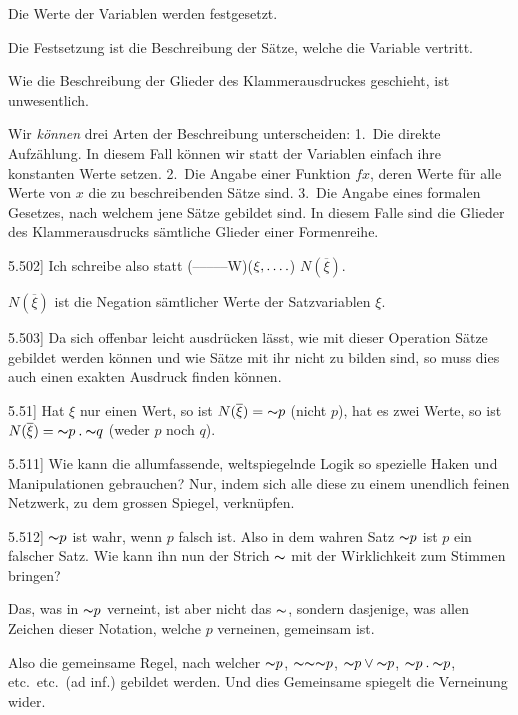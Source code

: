 \documentclass[12pt,oneside]{book}[2007/10/19]
\newcommand{\PropERef}[1]{\hyperref[PropE:#1]{#1}}
\newcommand{\PropositionG}[2]{%
  \item[\phantomsection\label{PropG:#1}\PropERef{#1}] #2%
}
\newcommand{\DPtypo}[2]{#2}
\newcommand{\Not}[1]{\mathord{\thicksim} #1}
\newcommand{\DotOp}{\mathbin{.}}
\newcommand{\Emph}[1]{\emph{#1}}%
\newcommand{\fourdots}{\mathinner{\ldotp\ldotp\ldotp\ldotp}}
\newcommand{\AllowBreak}{\discretionary{}{}{}}
\begin{document}
\begin{propositions}
{Die Werte der Variablen werden festgesetzt.

Die Festsetzung ist die Beschreibung der Sätze,
welche die Variable vertritt.

Wie die Beschreibung der Glieder des Klammerausdruckes
geschieht, ist unwesentlich.

Wir \Emph{können} drei Arten der Beschreibung
unterscheiden: 1.~Die direkte Aufzählung. In
diesem Fall können wir statt der Variablen einfach
ihre konstanten Werte setzen. 2.~Die Angabe
einer Funktion $fx$, deren Werte für alle Werte von
$x$ die zu beschreibenden Sätze sind. 3.~Die Angabe
eines formalen Gesetzes, nach welchem jene Sätze
gebildet sind. In diesem Falle sind die Glieder des
Klammerausdrucks sämtliche Glieder einer Formenreihe.}


\PropositionG{5.502}
{Ich schreibe also statt \mbox{\glqq{}(--\;--\;--\;--\;--W)}\AllowBreak($\xi, \fourdots$)\grqq{}
\glqq{}$N(\overline{\xi})$\grqq{}.

$N(\overline{\xi})$ ist die Negation sämtlicher Werte der
Satzvariablen $\xi$.}


\PropositionG{5.503}
{Da sich offenbar leicht ausdrücken lässt, wie mit
dieser Operation Sätze gebildet werden können und
wie Sätze mit ihr nicht zu bilden sind, so muss
dies auch einen exakten Ausdruck finden können.}


\PropositionG{5.51}
{Hat $\xi$ nur einen Wert, so ist $N(\overline{\xi}) = \Not{p}$ (nicht $p$),
hat es zwei Werte, so ist $N(\overline{\xi}) = \Not{p} \DotOp \Not{q}$ (weder
$p$ noch $q$).}


\PropositionG{5.511}
{Wie kann die allumfassende, weltspiegelnde
Logik so spezielle Haken und Manipulationen
gebrauchen? Nur, indem sich alle diese zu einem
unendlich feinen Netzwerk, zu dem grossen Spiegel,
verknüpfen.}


\PropositionG{5.512}
{\glqq{}$\Not{p}$\grqq{} ist wahr, wenn \glqq{}$p$\grqq{} falsch ist. Also in
dem wahren Satz \glqq{}$\Not{p}$\grqq{} ist \glqq{}$p$\grqq{} ein falscher Satz.
Wie kann ihn nun der Strich \glqq{}$\Not{}$\grqq{} mit der Wirklichkeit
zum Stimmen bringen?

Das, was in \glqq{}$\Not{p}$\grqq{} verneint, ist aber nicht das
\glqq{}$\Not{}$\grqq{}, sondern dasjenige, was allen Zeichen dieser
Notation, welche $p$ verneinen, gemeinsam ist.

Also die gemeinsame Regel, nach welcher
\glqq{}$\Not{p}$\grqq{}, \glqq{}$\Not{\Not{\Not{p}}}$\grqq{}, \glqq{}$\Not{p} \lor \Not{p}$\grqq{}, \glqq{}$\Not{p} \DotOp \Not{p}$\grqq{}, etc.\ etc.\ (ad
inf.) gebildet werden. Und dies Gemeinsame
spiegelt die Verneinung \DPtypo{wieder}{wider}.}



\end{propositions}
\end{document}
